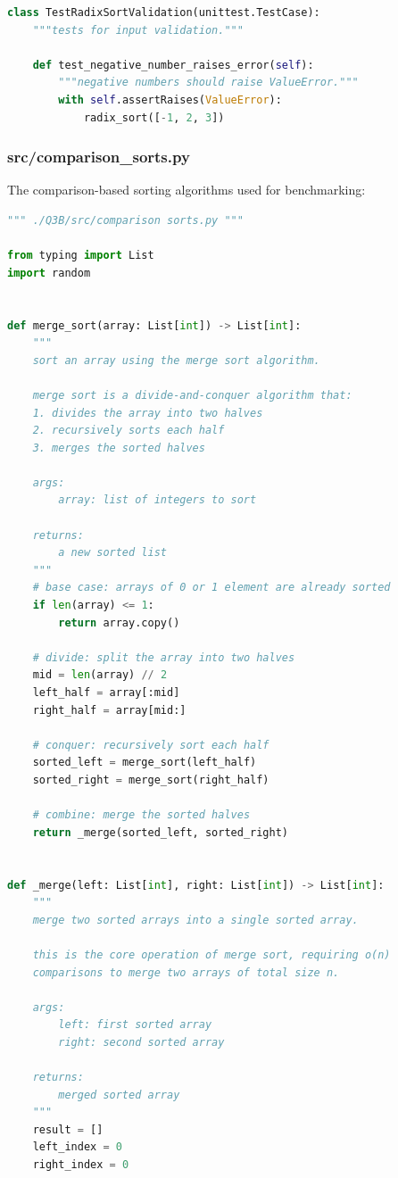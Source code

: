 \documentclass[12pt]{article}
\begin{document}
\begin{lstlisting}[language=Python]
class TestRadixSortValidation(unittest.TestCase):
    """tests for input validation."""

    def test_negative_number_raises_error(self):
        """negative numbers should raise ValueError."""
        with self.assertRaises(ValueError):
            radix_sort([-1, 2, 3])
\end{lstlisting}

\newpage
\subsubsection{src/comparison\_sorts.py}

The comparison-based sorting algorithms used for benchmarking:

\begin{lstlisting}[language=Python]
""" ./Q3B/src/comparison sorts.py """

from typing import List
import random


def merge_sort(array: List[int]) -> List[int]:
    """
    sort an array using the merge sort algorithm.

    merge sort is a divide-and-conquer algorithm that:
    1. divides the array into two halves
    2. recursively sorts each half
    3. merges the sorted halves

    args:
        array: list of integers to sort

    returns:
        a new sorted list
    """
    # base case: arrays of 0 or 1 element are already sorted
    if len(array) <= 1:
        return array.copy()

    # divide: split the array into two halves
    mid = len(array) // 2
    left_half = array[:mid]
    right_half = array[mid:]

    # conquer: recursively sort each half
    sorted_left = merge_sort(left_half)
    sorted_right = merge_sort(right_half)

    # combine: merge the sorted halves
    return _merge(sorted_left, sorted_right)


def _merge(left: List[int], right: List[int]) -> List[int]:
    """
    merge two sorted arrays into a single sorted array.

    this is the core operation of merge sort, requiring o(n)
    comparisons to merge two arrays of total size n.

    args:
        left: first sorted array
        right: second sorted array

    returns:
        merged sorted array
    """
    result = []
    left_index = 0
    right_index = 0


\end{lstlisting}
\end{document}
